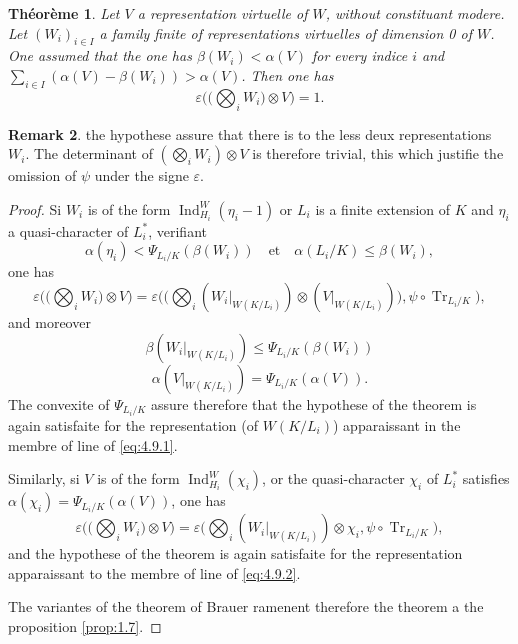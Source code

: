 \documentclass[12pt,a4paper]{article}
\theoremstyle{plain}
\newtheorem{theorem}{Th\'eor\`eme}[section]
\theoremstyle{definition}
\newtheorem{remark}[theorem]{Remark}
\theoremstyle{remark}
\DeclareMathOperator{\Ind}{Ind}
\DeclareMathOperator{\Tr}{Tr}
\providecommand{\Tr}{\operatorname{Tr}}
\begin{document}
\begin{theorem}\label{thm:4.9}
Let $V$ a representation virtuelle of $W$, without constituant modere. Let $(W_i)_{i \in I}$ a family finite of representations virtuelles of dimension 0 of $W$. One assumed that the one has $\beta(W_i) < \alpha(V)$ for every indice $i$ and $\sum_{i \in I}(\alpha(V) - \beta(W_i)) > \alpha(V)$. Then one has
\[
\varepsilon\biggl(\bigl(\bigotimes_i W_i\bigr) \otimes V\biggr) = 1.
\]
\end{theorem}

\begin{remark}
the hypothese assure that there is to the less deux representations $W_i$. The determinant of $(\bigotimes_i W_i) \otimes V$ is therefore trivial, this which justifie the omission of $\psi$ under the signe $\varepsilon$.
\end{remark}

\begin{proof}
Si $W_i$ is of the form $\Ind_{H_i}^W(\eta_i - 1)$ or $L_i$ is a finite extension of $K$ and $\eta_i$ a quasi-character of $L_i^*$, verifiant
\[
\alpha(\eta_i) < \Psi_{L_i/K}(\beta(W_i)) \quad \text{et} \quad \alpha(L_i/K) \leq \beta(W_i),
\]
one has
\begin{equation}\label{eq:4.9.1}
\varepsilon\biggl(\bigl(\bigotimes_i W_i\bigr) \otimes V\biggr) = \varepsilon\biggl(\bigl(\bigotimes_i (W_i|_{W(K/L_i)}) \otimes (V|_{W(K/L_i)})\bigr), \psi \circ \Tr_{L_i/K}\biggr),
\end{equation}
and moreover
\[
\beta(W_i|_{W(K/L_i)}) \leq \Psi_{L_i/K}(\beta(W_i))
\]
\[
\alpha(V|_{W(K/L_i)}) = \Psi_{L_i/K}(\alpha(V)).
\]
The convexite of $\Psi_{L_i/K}$ assure therefore that the hypothese of the theorem is again satisfaite for the representation (of $W(K/L_i)$) apparaissant in the membre of line of \eqref{eq:4.9.1}.

Similarly, si $V$ is of the form $\Ind_{H_i}^W(\chi_i)$, or the quasi-character $\chi_i$ of $L_i^*$ satisfies $\alpha(\chi_i) = \Psi_{L_i/K}(\alpha(V))$, one has
\begin{equation}\label{eq:4.9.2}
\varepsilon\biggl(\bigl(\bigotimes_i W_i\bigr) \otimes V\biggr) = \varepsilon\biggl(\bigotimes_i (W_i|_{W(K/L_i)}) \otimes \chi_i, \psi \circ \Tr_{L_i/K}\biggr),
\end{equation}
and the hypothese of the theorem is again satisfaite for the representation apparaissant to the membre of line of \eqref{eq:4.9.2}.

The variantes of the theorem of Brauer ramenent therefore the theorem a the proposition \ref{prop:1.7}.
\end{proof}
\end{document}
